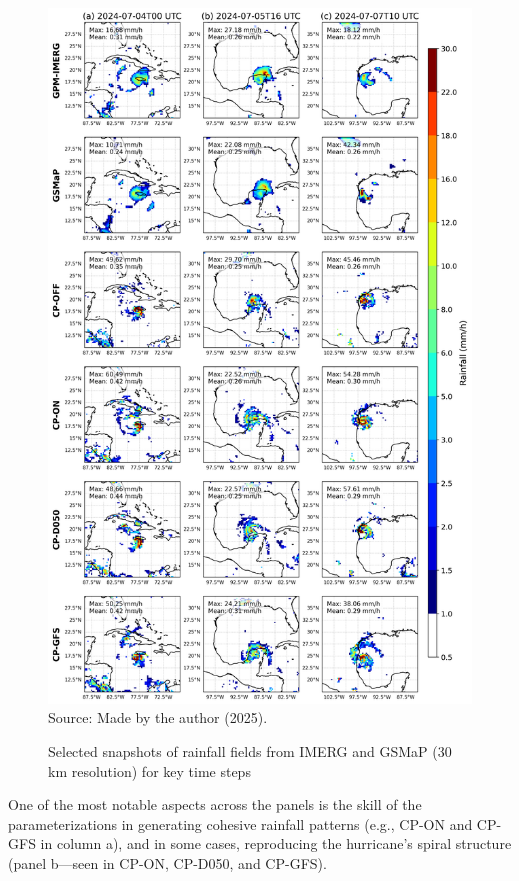 \begin{figure}[!ht]
	\centering
	\caption{Selected snapshots of rainfall fields from IMERG and GSMaP (30 km resolution) for key time steps} %
	\includegraphics[width=\textwidth]{docs/figuras/chapter5/painel_instantaneous_rainfall_selected_with_stats_FINAL.png} 
	\vspace{0.5em}
	Source: Made by the author (2025).  %
	\label{fig:snapshot} %
\end{figure}

One of the most notable aspects across the panels is the skill of the parameterizations in generating cohesive rainfall patterns (e.g., CP-ON and CP-GFS in column a), and in some cases, reproducing the hurricane's spiral structure (panel b—seen in CP-ON, CP-D050, and CP-GFS).

